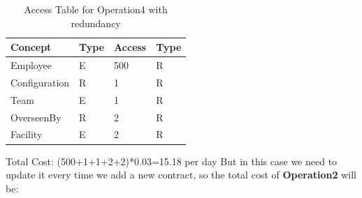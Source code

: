 \begin{table}[H]
    \renewcommand{\arraystretch}{1.3} %
    \begin{tabularx}{\textwidth}{|X|X|X|X|}
    \hline
    \textbf{Concept}& \textbf{Type}  & \textbf{Access}    & \textbf{Type}     \\ \hline
    Employee & E & 500 & R \\ \hline
    Configuration & R & 1 & R \\ \hline
    Team & E & 1 & R \\ \hline
    OverseenBy & R & 2 & R \\ \hline
    Facility & E & 2 & R \\ \hline
    \end{tabularx}
    \caption{Access Table for Operation4 with redundancy}
\end{table}
\noindent Total Cost: (500+1+1+2+2)*0.03=15.18 per day
\newline
\noindent But in this case we need to update it every time we add a new contract, so the total cost of \textbf{Operation2} will be:

